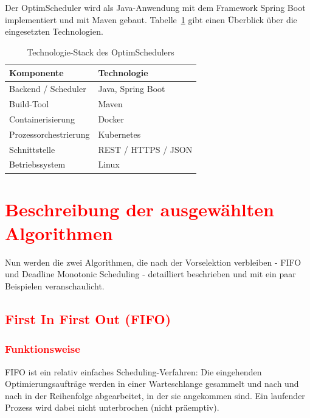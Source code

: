 \documentclass[
    12pt,               
    a4paper,            
    ngerman,            
    parskip=half,       
    headings=normal,   
    numbers=enddot,     
    toc=chapterentrywithdots 
]{scrreprt}\usepackage[utf8]{inputenc}
\begin{document}
Der OptimScheduler wird als Java-Anwendung mit dem Framework Spring Boot implementiert und mit Maven gebaut. Tabelle~\ref{tab:techstack} gibt einen Überblick über die eingesetzten Technologien.

\begin{table}[H]
    \centering
    {\setlength{\arrayrulewidth}{0.3pt}
    \begin{tabular}{|p{} | p{}|}
        \hline
        \textbf{Komponente} & \textbf{Technologie} \\
        \hline
        Backend / Scheduler & Java, Spring Boot \\
        \hline
        Build-Tool & Maven \\
        \hline
        Containerisierung & Docker \\
        \hline
        Prozessorchestrierung & Kubernetes \\
        \hline
        Schnittstelle & REST / HTTPS / JSON \\
        \hline
        Betriebssystem & Linux \\
        \hline
    \end{tabular}}
    \caption{Technologie-Stack des OptimSchedulers}
    \label{tab:techstack}
\end{table}

\newpage
\section{\textcolor{red}{Beschreibung der ausgewählten Algorithmen}}
Nun werden die zwei Algorithmen, die nach der Vorselektion verbleiben - FIFO und Deadline Monotonic Scheduling - detailliert beschrieben und mit ein paar Beispielen veranschaulicht.

\subsection{\textcolor{red}{First In First Out (FIFO)}}

\subsubsection{\textcolor{red}{Funktionsweise}}
FIFO ist ein relativ einfaches Scheduling-Verfahren: Die eingehenden Optimierungsaufträge werden in einer Warteschlange gesammelt und nach und nach in der Reihenfolge abgearbeitet, in der sie angekommen sind. Ein laufender Prozess wird dabei nicht unterbrochen (nicht präemptiv). 
\end{document}
